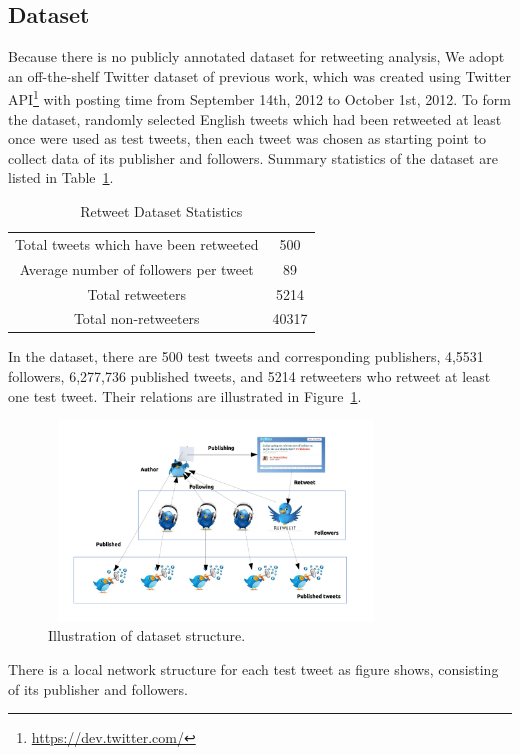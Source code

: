 \documentclass{acm_proc_article-sp}
\begin{document}
\subsection{Dataset}
Because there is no publicly annotated dataset for retweeting analysis, We adopt an off-the-shelf Twitter dataset of previous work\cite{Luo:2013RMF}, which was created using Twitter API\footnote{\url{https://dev.twitter.com/}} with posting time from September 14th, 2012 to October 1st, 2012.
To form the dataset, randomly selected English tweets which had been retweeted at least once were used as test tweets, then each tweet was chosen as starting point to collect data of its publisher and followers.
Summary statistics of the dataset are listed in Table~\ref{datasetstat}.
\begin{table}
\centering
\caption{Retweet Dataset Statistics}
\label{datasetstat}
\begin{tabular}{|c|c|}
\hline
Total tweets which have been retweeted & 500 \\
Average number of followers per tweet & 89 \\
Total retweeters & 5214 \\
Total non-retweeters & 40317  \\
\hline
\end{tabular}
\end{table}
In the dataset, there are 500 test tweets and corresponding publishers, 4,5531 followers, 6,277,736 published tweets, and 5214 retweeters who retweet at least one test tweet. 
Their relations are illustrated in Figure~\ref{fig:graph3}.
\begin{figure}[htb]
\centering%
\includegraphics[width=3.5in,height=2.1in]{dataset.pdf}
\caption{Illustration of dataset structure.}
\label{fig:graph3}
\end{figure}
There is a local network structure for each test tweet as figure shows, consisting of its publisher and followers.
\end{document}
